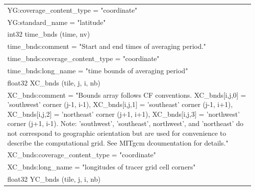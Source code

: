 \begin{longtable}{|p{\textwidth}|}
\rowcolor{Apricot}\hspace{0.5cm}\hspace{0.5cm}YG:coverage\_content\_type = "coordinate"\\
\rowcolor{Apricot}\hspace{0.5cm}\hspace{0.5cm}YG:standard\_name = "latitude"\\
\rowcolor{Apricot}\hspace{0.5cm}int32 time\_bnds (time, nv)\\
\rowcolor{Apricot}\hspace{0.5cm}\hspace{0.5cm}time\_bnds:comment = "Start and end times of averaging period."\\
\rowcolor{Apricot}\hspace{0.5cm}\hspace{0.5cm}time\_bnds:coverage\_content\_type = "coordinate"\\
\rowcolor{Apricot}\hspace{0.5cm}\hspace{0.5cm}time\_bnds:long\_name = "time bounds of averaging period"\\
\rowcolor{Apricot}\hspace{0.5cm}float32 XC\_bnds (tile, j, i, nb)\\
\rowcolor{Apricot}\hspace{0.5cm}\hspace{0.5cm}XC\_bnds:comment = "Bounds array follows CF conventions. XC\_bnds[i,j,0] = 'southwest' corner (j-1, i-1), XC\_bnds[i,j,1] = 'southeast' corner (j-1, i+1), XC\_bnds[i,j,2] = 'northeast' corner (j+1, i+1), XC\_bnds[i,j,3]  = 'northwest' corner (j+1, i-1). Note: 'southwest', 'southeast', northwest', and 'northeast' do not correspond to geographic orientation but are used for convenience to describe the computational grid. See MITgcm dcoumentation for details."\\
\rowcolor{Apricot}\hspace{0.5cm}\hspace{0.5cm}XC\_bnds:coverage\_content\_type = "coordinate"\\
\rowcolor{Apricot}\hspace{0.5cm}\hspace{0.5cm}XC\_bnds:long\_name = "longitudes of tracer grid cell corners"\\
\rowcolor{Apricot}\hspace{0.5cm}float32 YC\_bnds (tile, j, i, nb)\\

\end{longtable}
